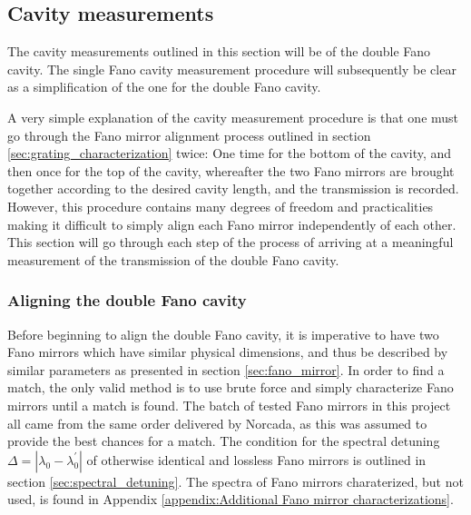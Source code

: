 \subsection{Cavity measurements}\label{sec:cavity_measurements}

The cavity measurements outlined in this section will be of the double Fano cavity. The single Fano cavity measurement procedure will subsequently be clear as a simplification of the one for the double Fano cavity. 

A very simple explanation of the cavity measurement procedure is that one must go through the Fano mirror alignment process outlined in section \ref{sec:grating_characterization} twice: One time for the bottom of the cavity, and then once for the top of the cavity, whereafter the two Fano mirrors are brought together according to the desired cavity length, and the transmission is recorded. However, this procedure contains many degrees of freedom and practicalities making it difficult to simply align each Fano mirror independently of each other. This section will go through each step of the process of arriving at a meaningful measurement of the transmission of the double Fano cavity.

\subsubsection{Aligning the double Fano cavity}

Before beginning to align the double Fano cavity, it is imperative to have two Fano mirrors which have similar physical dimensions, and thus be described by similar parameters as presented in section \ref{sec:fano_mirror}. In order to find a match, the only valid method is to use brute force and simply characterize Fano mirrors until a match is found. The batch of tested Fano mirrors in this project all came from the same order delivered by Norcada, as this was assumed to provide the best chances for a match. The condition for the spectral detuning $\Delta = |\lambda_{0} - \lambda^{\prime}_{0}|$ of otherwise identical and lossless Fano mirrors is outlined in section \ref{sec:spectral_detuning}. The spectra of Fano mirrors charaterized, but not used, is found in Appendix \ref{appendix:Additional Fano mirror characterizations}.


